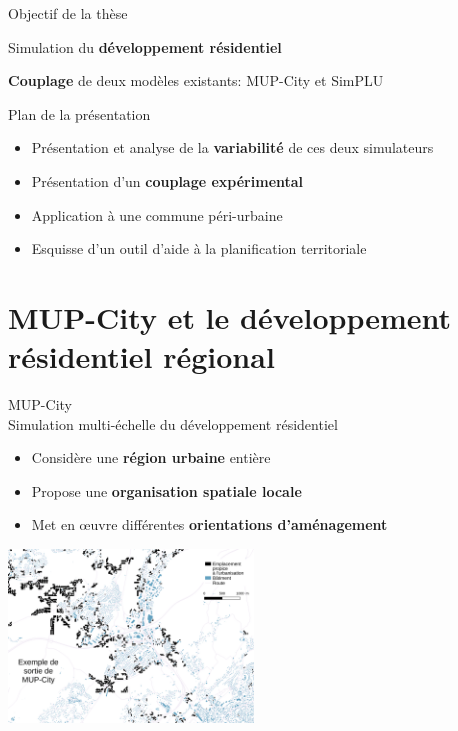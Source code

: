 \documentclass[xcolor=table]{beamer}
\begin{document}
\begin{frame}{Objectif de la thèse}
	\begin{block}{}
			Simulation du \textbf{développement résidentiel}
	\end{block}
	\begin{block}{}
			\textbf{Couplage} de deux modèles existants: MUP-City et SimPLU
	\end{block}
\end{frame}
\begin{frame}{Plan de la présentation}
	\begin{itemize}[<+- | alert@+>]
		\item Présentation et analyse de la \textbf{variabilité} de ces deux simulateurs
		\item Présentation d'un \textbf{couplage expérimental}
		\item Application à une commune péri-urbaine
		\item Esquisse d'un outil d'aide à la planification territoriale
	\end{itemize}
\end{frame}

\section[MUP-City]{MUP-City et le développement résidentiel régional}

\begin{frame}{MUP-City}
	\\
	Simulation multi-échelle du développement résidentiel 
	\begin{itemize}
		\item Considère une \textbf{région urbaine} entière
		\item Propose une \textbf{organisation spatiale locale}
		\item Met en œuvre différentes \textbf{orientations d'aménagement}
	\end{itemize}
	\includegraphics[width=6.5cm]{Images/ex-sorties-mup.png}
\end{frame}
\end{document}
